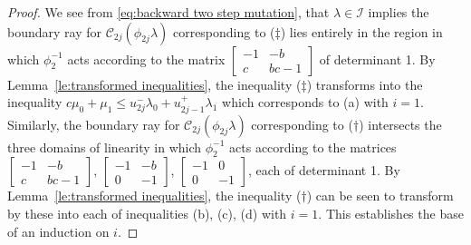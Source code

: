 \documentclass{amsart}
\numberwithin{theorem}{section}
\newcommand{\cC}{\mathcal{C}}
\newcommand{\cI}{\mathcal{I}}
\begin{document}
\begin{proof}
    We see from \eqref{eq:backward two step mutation}, that $\lambda\in\cI$ implies the boundary ray for $\cC_{2j}(\phi_{2j}\lambda)$ corresponding to ($\ddagger$) lies entirely in the region in which $\phi_2^{-1}$ acts according to the matrix $\left[ \begin{array}{cc} -1 & -b\\ c & bc-1 \end{array}\right]$ of determinant 1.
    By Lemma~\ref{le:transformed inequalities}, the inequality ($\ddagger$) transforms into the inequality $c\mu_0+\mu_1\le u_{2j}^-\lambda_0+u_{2j-1}^+\lambda_1$ which corresponds to (a) with $i=1$.
    Similarly, the boundary ray for $\cC_{2j}(\phi_{2j}\lambda)$ corresponding to ($\dagger$) intersects the three domains of linearity in which $\phi_2^{-1}$ acts according to the matrices $\left[ \begin{array}{cc} -1 & -b\\ c & bc-1 \end{array}\right]$, $\left[ \begin{array}{cc} -1 & -b\\ 0 & -1 \end{array}\right]$, $\left[ \begin{array}{cc} -1 & 0\\ 0 & -1 \end{array}\right]$, each of determinant 1.
    By Lemma~\ref{le:transformed inequalities}, the inequality ($\dagger$) can be seen to transform by these into each of inequalities (b), (c), (d) with $i=1$.
    This establishes the base of an induction on $i$.


\end{proof}
\end{document}

